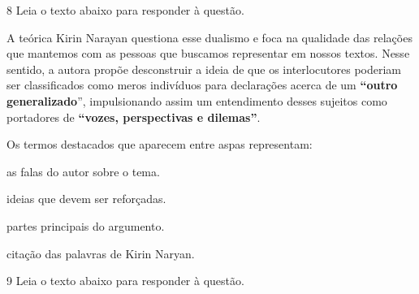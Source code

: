 \num{8} Leia o texto abaixo para responder à questão. 

\begin{myquote}

A teórica Kirin Narayan questiona esse dualismo e foca na qualidade das
relações que mantemos com as pessoas que buscamos representar em nossos
textos. Nesse sentido, a autora propõe desconstruir a ideia de que os
interlocutores poderiam ser classificados como meros indivíduos para
declarações acerca de um \textbf{``outro generalizado}'', impulsionando
assim um entendimento desses sujeitos como portadores de
\textbf{``vozes, perspectivas e dilemas''}.


\end{myquote}


Os termos destacados que aparecem entre aspas representam:

\begin{escolha}

    \item as falas do autor sobre o tema.

    \item ideias que devem ser reforçadas.

    \item partes principais do argumento.

    \item citação das palavras de Kirin Naryan.

\end{escolha}

\num{9} Leia o texto abaixo para responder à questão. 

